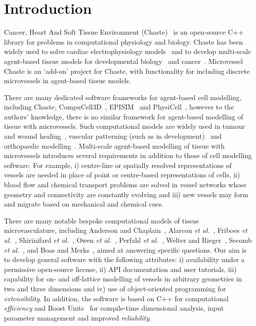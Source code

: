 \documentclass[10pt,letterpaper]{article}
\begin{document}
\linenumbers

\section*{Introduction}
Cancer, Heart And Soft Tissue Environment (Chaste)~\cite{Mirams2013} is an open-source C++ library for problems in computational physiology and biology. Chaste has been widely used to solve cardiac electrophysiology models~\cite{Cooper2015} and to develop multi-scale agent-based tissue models for developmental biology~\cite{Tetley2016} and cancer~\cite{Dunn2016}. Microvessel Chaste is an `add-on' project for Chaste, with functionality for including discrete microvessels in agent-based tissue models.

There are many dedicated software frameworks for agent-based cell modelling, including Chaste, CompuCell3D~\cite{Swat2012}, EPISIM~\cite{Sutterlin2013} and PhysiCell~\cite{Macklin2012}, however to the authors' knowledge, there is no similar framework for agent-based modelling of tissue with microvessels. Such computational models are widely used in tumour and wound healing~\cite{Owen2011}, vascular patterning (such as in development)~\cite{Secomb2013} and orthopaedic modelling~\cite{Carlier2012}. Multi-scale agent-based modelling of tissue with microvessels introduces several requirements in addition to those of cell modelling software. For example, i) centre-line or spatially resolved representations of vessels are needed in place of point or centre-based representations of cells, ii) blood flow and chemical transport problems are solved in vessel networks whose geometry and connectivity are constantly evolving and iii) new vessels may form and migrate based on mechanical and chemical cues. 

There are many notable bespoke computational models of tissue microvasculature, including Anderson and Chaplain~\cite{Anderson1998}, Alarcon \emph{et al.}~\cite{Alarcon2006}, Friboes \emph{et al.}~\cite{Frieboes2007}, Shirinifard \emph{et al.}~\cite{Shirinifard2009}, Owen \emph{et al.}~\cite{Owen2011}, Perfahl \emph{et al.}~\cite{Perfahl2011}, Welter and Rieger~\cite{Welter2013}, Secomb \emph{et al.}~\cite{Secomb2013}, and Boas and Merks~\cite{Boas2015}, aimed at answering specific questions. Our aim is to develop general software with the following attributes: i) availability under a permissive open-source license, ii) API documentation and user tutorials, iii) capability for on- and off-lattice modelling of vessels in arbitrary geometries in two and three dimensions and iv) use of object-oriented programming for \emph{extensibility}. In addition, the software is based on C++ for computational \emph{efficiency} and Boost Units~\cite{boost161} for compile-time dimensional analysis, input parameter management and improved \emph{reliability}. 
\end{document}
